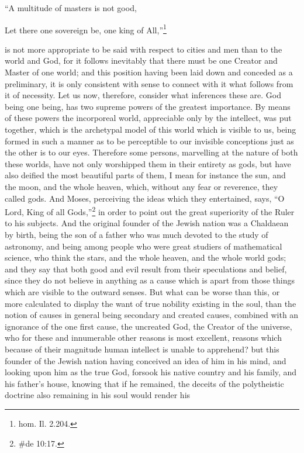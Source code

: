 ``A multitude of masters is not good,

Let there one sovereign be, one king of All,''\footnote{hom. Il. 2.204.}

is not more appropriate to be said with respect to cities and men than to the world and God, for it
follows inevitably that there must be one Creator and Master of one world; and this position having
been laid down and conceded as a preliminary, it is only consistent with sense to connect with it
what follows from it of necessity. Let us now, therefore, consider what inferences these are. God
being one being, has two supreme powers of the greatest importance. By means of these powers
the incorporeal world, appreciable only by the intellect, was put together, which is the archetypal
model of this world which is visible to us, being formed in such a manner as to be perceptible to our
invisible conceptions just as the other is to our eyes. Therefore some persons, marvelling at the
nature of both these worlds, have not only worshipped them in their entirety as gods, but have also
deified the most beautiful parts of them, I mean for instance the sun, and the moon, and the whole
heaven, which, without any fear or reverence, they called gods. And Moses, perceiving the ideas
which they entertained, says, ``O Lord, King of all Gods,''\footnote{\#de 10:17.} in order to point out the
great superiority of the Ruler to his subjects. And the original founder of the Jewish nation was a
Chaldaean by birth, being the son of a father who was much devoted to the study of astronomy,
and being among people who were great studiers of mathematical science, who think the stars,
and the whole heaven, and the whole world gods; and they say that both good and evil result from
their speculations and belief, since they do not believe in anything as a cause which is apart from
those things which are visible to the outward senses. But what can be worse than this, or more
calculated to display the want of true nobility existing in the soul, than the notion of causes in
general being secondary and created causes, combined with an ignorance of the one first cause,
the uncreated God, the Creator of the universe, who for these and innumerable other reasons is
most excellent, reasons which because of their magnitude human intellect is unable to apprehend?
but this founder of the Jewish nation having conceived an idea of him in his mind, and looking upon
him as the true God, forsook his native country and his family, and his father's house, knowing that
if he remained, the deceits of the polytheistic doctrine also remaining in his soul would render his
